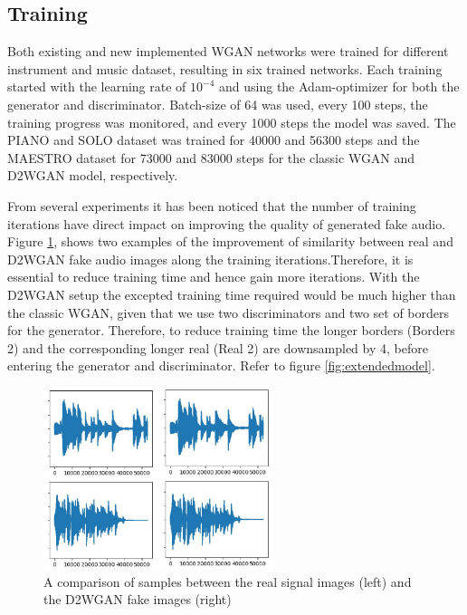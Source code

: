 \documentclass{article} %
\begin{document}
\subsection{Training}
Both existing and new implemented WGAN networks were trained for different instrument and music dataset, resulting in six trained networks. Each training started with the learning rate of $10^{-4}$ and using the Adam-optimizer for both the generator and discriminator. Batch-size of 64 was used, every 100 steps, the training progress was monitored, and every 1000 steps the model was saved. The PIANO and SOLO dataset was trained for 40000 and 56300 steps and the MAESTRO dataset for 73000 and 83000 steps for the classic WGAN and D2WGAN model, respectively. 

From several experiments it has been noticed that the number of training iterations have direct impact on improving the quality of generated fake audio. Figure \ref{fig:realfakeimages}, shows two examples of the improvement of similarity between real and D2WGAN fake audio images along the training iterations.Therefore, it is essential to reduce training time and hence gain more iterations. With the D2WGAN setup the excepted training time required would be much higher than the classic WGAN, given that we use two discriminators and two set of borders for the generator. Therefore, to reduce training time the longer borders (Borders 2) and the corresponding longer real (Real 2) are downsampled by 4, before entering the generator and discriminator. Refer to figure \ref{fig:extendedmodel}.

\begin{figure}[h]
    \includegraphics[width=0.6\textwidth]{images/extend/extend_realfake_image.jpg}
    \centering
    \caption{A comparison of samples between the real signal images (left) and the D2WGAN fake images (right)}
    \label{fig:realfakeimages}
\end{figure}
\end{document}
